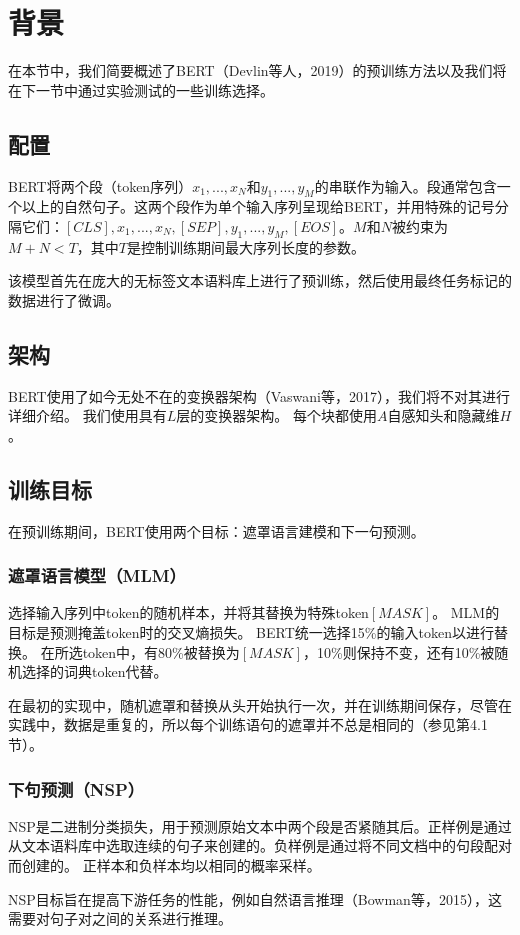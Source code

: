 \documentclass[lang=cn,11pt,a4paper,twocolumn]{elegantpaper}
\begin{document}
\section{背景}
在本节中，我们简要概述了BERT（Devlin等人，2019）的预训练方法以及我们将在下一节中通过实验测试的一些训练选择。
\subsection{配置}
BERT将两个段（token序列）$x_1,...,x_N$和$y_1,...,y_M$的串联作为输入。段通常包含一个以上的自然句子。这两个段作为单个输入序列呈现给BERT，并用特殊的记号分隔它们：$[CLS],x_1,...,x_N,[SEP],y_1,...,y_M,[EOS]$。$M$和$N$被约束为$M+N<T$，其中$T$是控制训练期间最大序列长度的参数。

该模型首先在庞大的无标签文本语料库上进行了预训练，然后使用最终任务标记的数据进行了微调。

\subsection{架构}
BERT使用了如今无处不在的变换器架构（Vaswani等，2017），我们将不对其进行详细介绍。 我们使用具有$L$层的变换器架构。 每个块都使用$A$自感知头和隐藏维$H$。

\subsection{训练目标}
在预训练期间，BERT使用两个目标：遮罩语言建模和下一句预测。
\subsubsection{遮罩语言模型（MLM）}
选择输入序列中token的随机样本，并将其替换为特殊token$[MASK]$。 MLM的目标是预测掩盖token时的交叉熵损失。 BERT统一选择15\%的输入token以进行替换。 在所选token中，有80\%被替换为$[MASK]$，10\%则保持不变，还有10\%被随机选择的词典token代替。

在最初的实现中，随机遮罩和替换从头开始执行一次，并在训练期间保存，尽管在实践中，数据是重复的，所以每个训练语句的遮罩并不总是相同的（参见第4.1节）。
\subsubsection{下句预测（NSP）}
NSP是二进制分类损失，用于预测原始文本中两个段是否紧随其后。正样例是通过从文本语料库中选取连续的句子来创建的。负样例是通过将不同文档中的句段配对而创建的。 正样本和负样本均以相同的概率采样。

NSP目标旨在提高下游任务的性能，例如自然语言推理（Bowman等，2015），这需要对句子对之间的关系进行推理。
\end{document}
